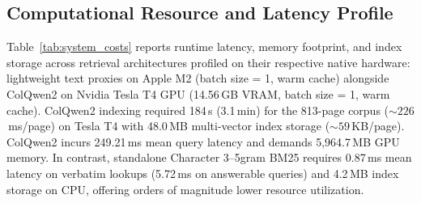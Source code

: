 \subsection{Computational Resource and Latency Profile}
\label{sec:system_costs_eval}

Table~\ref{tab:system_costs} reports runtime latency, memory footprint, and index storage across retrieval architectures profiled on their respective native hardware: lightweight text proxies on Apple M2 (batch size = 1, warm cache) alongside ColQwen2 on Nvidia Tesla T4 GPU (14.56\,GB VRAM, batch size = 1, warm cache). ColQwen2 indexing required 184\,s (3.1\,min) for the 813-page corpus ($\sim 226$\,ms/page) on Tesla T4 with 48.0\,MB multi-vector index storage ($\sim 59$\,KB/page). ColQwen2 incurs 249.21\,ms mean query latency and demands 5,964.7\,MB GPU memory. In contrast, standalone Character 3--5gram BM25 requires 0.87\,ms mean latency on verbatim lookups (5.72\,ms on answerable queries) and 4.2\,MB index storage on CPU, offering orders of magnitude lower resource utilization.

